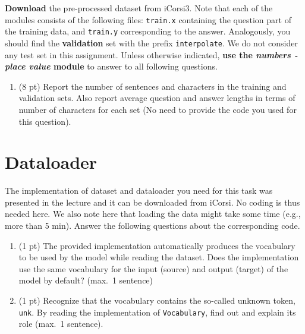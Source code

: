 \documentclass[a4paper,11pt]{article}
\begin{document}
\textbf{Download} the pre-processed dataset from iCorsi3.
Note that each of the modules consists of the following files:
\texttt{train.x} containing the question part of
the training data, and \texttt{train.y} corresponding to the answer. 
Analogously, you should find the \textbf{validation} set with the prefix \texttt{interpolate}.
We do not consider any test set in this assignment.
Unless otherwise indicated, \textbf{use the \textit{numbers - place value} module} to answer to
all following questions.

\begin{enumerate}
\item (8 pt) Report the number of sentences and characters in the training and validation sets. Also report average question and answer lengths in terms of number of characters for each set (No need to provide the code you used for this question).
\end{enumerate}

\section{Dataloader}
The implementation of dataset and dataloader you need for this task
was presented in the lecture and it can be downloaded from iCorsi.
No coding is thus needed here.
We also note here that loading the data might take some time (e.g., more than 5 min).
Answer the following questions about the corresponding code.

\begin{enumerate}
\item (1 pt) The provided implementation automatically produces the vocabulary to be used by the model while reading the dataset.
Does the implementation use the same vocabulary for the input (source) and output (target) of the model by default? (max.~1 sentence)
\item (1 pt) Recognize that the vocabulary contains the so-called unknown token, \texttt{unk}. By reading the implementation of \texttt{Vocabulary}, find out and explain its role (max.~1 sentence).
\end{enumerate}
\end{document}
